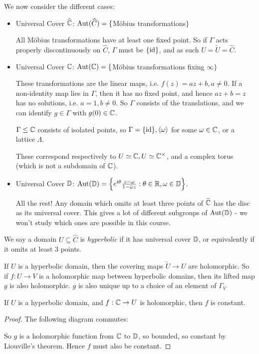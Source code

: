 \documentclass[10pt,a4paper]{article}
\begin{document}
We now consider the different cases:
\begin{itemize}
  \item Universal Cover $\widehat{\mathbb{C}}$: $\operatorname{Aut}(\widehat{C}) = \{$M\"obius transformations$\}$

  All M\"obius transformations have at least one fixed point. So if $\Gamma$ acts properly discontinuously on $\hat{C}$, $\Gamma$ must be $\{\operatorname{id}\}$, and as such $U = \tilde{U} = \hat{C}$.

  \item Universal Cover $\mathbb{C}$: $\operatorname{Aut}(\mathbb{C}) = \{$M\"obius transformations fixing $\infty\}$

  These transformations are the linear maps, i.e. $f(z) = az+b, a \neq 0$. If a non-identity map lies in $\Gamma$, then it has no fixed point, and hence $az+b=z$ has no solutions, i.e. $a=1, b \neq 0$. So $\Gamma$ consists of the translations, and we can identify $g \in \Gamma$ with $g(0) \in \mathbb{C}$.

  $\Gamma \leq \mathbb{C}$ consists of isolated points, so $\Gamma = \{\operatorname{id}\}, \langle \omega \rangle$ for some $\omega \in \mathbb{C}$, or a lattice $\Lambda$.

  These correspond respectively to $U \simeq \mathbb{C}, U \simeq \mathbb{C}^\times$, and a complex torus (which is not a subdomain of $\mathbb{C}$).

  \item Universal Cover $\mathbb{D}$: $\operatorname{Aut}(\mathbb{D}) = \left\{e^{\mathfrak{i}\theta} \frac{z-\omega}{1-\bar{\omega}z} : \theta \in \mathbb{R}, \omega \in \mathbb{D}\right\}$.

  All the rest! Any domain which omits at least three points of $\widehat{\mathbb{C}}$ has the disc as its universal cover. This gives a lot of different subgroups of $\operatorname{Aut}(\mathbb{D})$ - we won't study which ones are possible in this course.
\end{itemize}

\begin{definition}
  We say a domain $U \subseteq \hat{C}$ is \emph{hyperbolic} if it has universal cover $\mathbb{D}$, or equivalently if it omits at least 3 points.
\end{definition}

If $U$ is a hyperbolic domain, then the covering maps $\tilde{U} \to U$ are holomorphic. So if $f:U \to V$ is a holomorphic map between hyperbolic domains, then its lifted map $g$ is also holomorphic. $g$ is also unique up to a choice of an element of $\Gamma_V$

\begin{theorem}
  If $U$ is a hyperbolic domain, and $f : \mathbb{C} \to U$ is holomorphic, then $f$ is constant.
\end{theorem}
\begin{proof}
  The following diagram commutes:

  So $g$ is a holomorphic function from $\mathbb{C}$ to $\mathbb{D}$, so bounded, so constant by Liouville's theorem. Hence $f$ must also be constant.
\end{proof}
\end{document}
